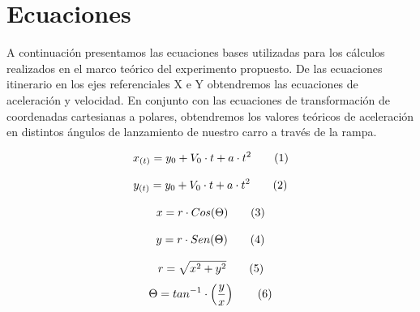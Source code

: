 \documentclass[twocolumn,12pt]{article}
\begin{document}
	\section{Ecuaciones}
 	A continuación presentamos las ecuaciones bases utilizadas para los cálculos realizados en el marco teórico del experimento propuesto. De las ecuaciones itinerario en los ejes referenciales X e Y obtendremos las ecuaciones de aceleración y velocidad. En conjunto con las ecuaciones de transformación de coordenadas cartesianas a polares, obtendremos los valores teóricos de aceleración en distintos ángulos de lanzamiento de nuestro carro a través de la rampa.
 	\vspace{-0.5cm}
 	\begin{center}

 	\begin{equation}
 		\centering
 		x_{(t)} = y_{0} + V_{0} \cdot t + a \cdot t^{2} 
 		\tag*{(1)} %
 	\end{equation}
 		
 	\vspace{-0.5cm}
 	
 	\begin{equation}
 		\centering
 		y_{(t)} = y_{0} + V_{0} \cdot t + a \cdot t^{2} \tag*{(2)} %
 	\end{equation}
 	
 	\vspace{-0.4cm}  
 	
	\centering{}
	
	\begin{equation}
		\centering
		x = r \cdot Cos (\Theta) \tag*{(3)} 
	\end{equation}
	
	\vspace{-0.4cm}
	
	\begin{equation}
		\centering
		y = r \cdot Sen (\Theta) \tag*{(4)} 
	\end{equation}
	
	\vspace{-0.4cm}  
	
	\centering{}
	\centering{}
	
	\begin{equation}
	\centering
	r = \sqrt{x^{2} + y^{2}} \tag*{(5)} 
	\end{equation}
	\vspace{-0.4cm}
	\begin{equation}
	\centering
	\Theta = tan^{-1} \cdot \left( \frac{y}{x} \right) \tag*{(6)} 
	\end{equation}
	\vspace{-0.4cm}  
	\centering{}
	\centering{}
	\end{center}
	
\end{document}
